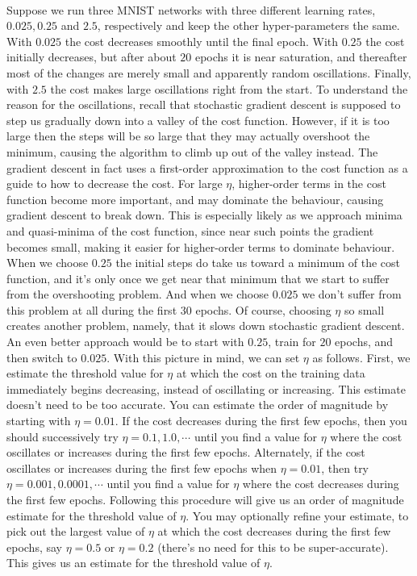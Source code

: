 \paragraph{} Suppose we run three MNIST networks with three different learning rates, $0.025, 0.25$ and $2.5$, respectively and keep the other hyper-parameters the same. With $0.025$ the cost decreases smoothly until the final epoch. With $0.25$ the cost initially decreases, but after about $20$ epochs it is near saturation, and thereafter most of the changes are merely small and apparently random oscillations. Finally, with $2.5$ the cost makes large oscillations right from the start. To understand the reason for the oscillations, recall that stochastic gradient descent is supposed to step us gradually down into a valley of the cost function. However, if it is too large then the steps will be so large that they may actually overshoot the minimum, causing the algorithm to climb up out of the valley instead. The gradient descent in fact uses a first-order approximation to the cost function as a guide to how to decrease the cost. For large $\eta$, higher-order terms in the cost function become more important, and may dominate the behaviour, causing gradient descent to break down. This is especially likely as we approach minima and quasi-minima of the cost function, since near such points the gradient becomes small, making it easier for higher-order terms to dominate behaviour. When we choose $0.25$ the initial steps do take us toward a minimum of the cost function, and it's only once we get near that minimum that we start to suffer from the overshooting problem. And when we choose $0.025$ we don't suffer from this problem at all during the first $30$ epochs. Of course, choosing $\eta$ so small creates another problem, namely, that it slows down stochastic gradient descent. An even better approach would be to start with $0.25$, train for $20$ epochs, and then switch to $0.025$.
With this picture in mind, we can set $\eta$ as follows. First, we estimate the threshold value for $\eta$ at which the cost on the training data immediately begins decreasing, instead of oscillating or increasing. This estimate doesn't need to be too accurate. You can estimate the order of magnitude by starting with $\eta=0.01$. If the cost decreases during the first few epochs, then you should successively try $\eta=0.1,1.0,\cdots$ until you find a value for $\eta$ where the cost oscillates or increases during the first few epochs. Alternately, if the cost oscillates or increases during the first few epochs when $\eta=0.01$, then try $\eta=0.001,0.0001,\cdots$ until you find a value for $\eta$ where the cost decreases during the first few epochs. Following this procedure will give us an order of magnitude estimate for the threshold value of $\eta$. You may optionally refine your estimate, to pick out the largest value of $\eta$ at which the cost decreases during the first few epochs, say $\eta=0.5$ or $\eta=0.2$ (there's no need for this to be super-accurate). This gives us an estimate for the threshold value of $\eta$.
 
